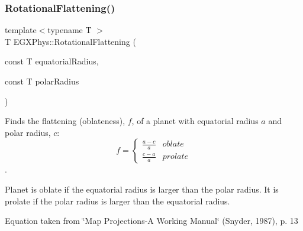 \subsubsection{\texorpdfstring{Rotational\+Flattening()}{RotationalFlattening()}\hspace{0.1cm}{\footnotesize\ttfamily [2/3]}}
{\footnotesize\ttfamily template$<$typename T $>$ \\
T E\+G\+X\+Phys\+::\+Rotational\+Flattening (\begin{DoxyParamCaption}\item[{const T}]{equatorial\+Radius,  }\item[{const T}]{polar\+Radius }\end{DoxyParamCaption})}



Finds the flattening (oblateness), $f$, of a planet with equatorial radius $a$ and polar radius, $c$\+: \[ f =\begin{cases} \frac{a-c}{a}{} & oblate \\ \frac{c-a}{a} & prolate \end{cases} \]. 

Planet is oblate if the equatorial radius is larger than the polar radius. It is prolate if the polar radius is larger than the equatorial radius.

Equation taken from \char`\"{}\+Map Projections-\/\+A Working Manual\char`\"{} (Snyder, 1987), p. 13

